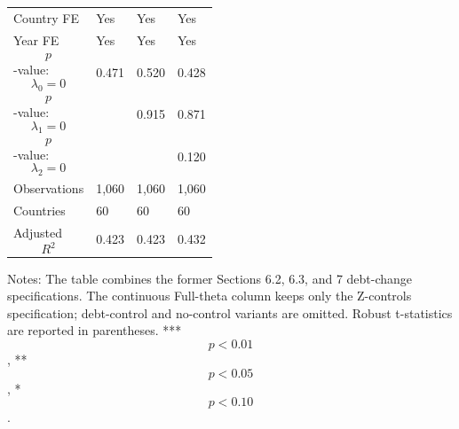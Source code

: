 \begin{table}[H]
\begin{threeparttable}
\begin{tabularx}{\textwidth}{lYYY}
Country FE & Yes & Yes & Yes \\
Year FE & Yes & Yes & Yes \\
$$p$$-value: $$\lambda_0=0$$ & 0.471 & 0.520 & 0.428 \\
$$p$$-value: $$\lambda_1=0$$ &  & 0.915 & 0.871 \\
$$p$$-value: $$\lambda_2=0$$ &  &  & 0.120 \\
Observations & 1,060 & 1,060 & 1,060 \\
Countries & 60 & 60 & 60 \\
Adjusted $$R^2$$ & 0.423 & 0.423 & 0.432 \\
\bottomrule
\end{tabularx}
\begin{tablenotes}[flushleft]\footnotesize
\item Notes: The table combines the former Sections 6.2, 6.3, and 7 debt-change specifications. The continuous Full-theta column keeps only the Z-controls specification; debt-control and no-control variants are omitted. Robust t-statistics are reported in parentheses. *** $$p<0.01$$, ** $$p<0.05$$, * $$p<0.10$$.
\end{tablenotes}
\end{threeparttable}
\end{table}
